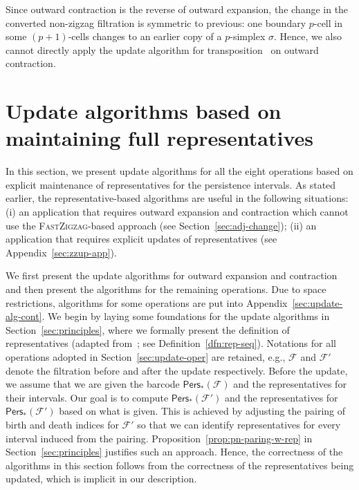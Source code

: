 \documentclass[letterpaper,11pt]{article}
\theoremstyle{mythmstyle}
\theoremstyle{mydefstyle}
\theoremstyle{plain}
\theoremstyle{definition}
\newcommand{\Pers}{\mathsf{Pers}}
\newcommand{\<}[1]{\langle #1\rangle}
\newcommand{\Fcal}{\mathcal{F}}
\newcommand{\sG}{\sigma}
\newcommand{\Dim}{p}
\begin{document}
Since outward contraction is the reverse of outward expansion,
the change in the converted non-zigzag filtration is symmetric to previous:
one boundary $\Dim$-cell in some $(\Dim+1)$-cells changes to an 
earlier copy of a $\Dim$-simplex $\sG$.
Hence, we also cannot directly apply the update algorithm for transposition~\cite{cohen2006vines}
on outward contraction.

\section{Update algorithms based on maintaining full representatives}
\label{sec:update-alg}


In this section, we present update algorithms for {all} the eight operations
based on explicit maintenance of representatives for the persistence intervals.
As stated earlier, the representative-based algorithms are useful 
in the following situations:
(i) an application that requires outward expansion and contraction which
cannot use the \textsc{FastZigzag}-based approach
(see Section~\ref{sec:adj-change});
(ii) an application that requires explicit updates of representatives (see Appendix~\ref{sec:zzup-app}).

We first present the update algorithms
for outward expansion and contraction 
and then present the algorithms for the remaining operations.
Due to space restrictions,
algorithms for some operations are put into Appendix~\ref{sec:update-alg-cont}.
We begin by
laying some foundations 
for the update algorithms
in Section~\ref{sec:principles},
where we formally present the definition of representatives 
(adapted from~\cite{maria2014zigzag}; see Definition~\ref{dfn:rep-seq}).
Notations for all operations adopted in Section~\ref{sec:update-oper} are retained, 
e.g.,
$\Fcal$ and $\Fcal'$
denote the filtration before and after the update respectively.
Before the update,
we assume that we are given the barcode $\Pers_*(\Fcal)$
and the representatives for their intervals.
Our goal is to compute $\Pers_*(\Fcal')$ and the representatives for
$\Pers_*(\Fcal')$ based on what is given.
This is achieved by adjusting the pairing of birth and death indices 
for $\Fcal'$ so that we can identify representatives
for every interval induced from the pairing.
Proposition~\ref{prop:pn-paring-w-rep} in Section~\ref{sec:principles}
justifies such an approach.
Hence, the correctness of the algorithms in this section follows
from the correctness of the representatives being updated,
which is implicit in our description.
\end{document}
